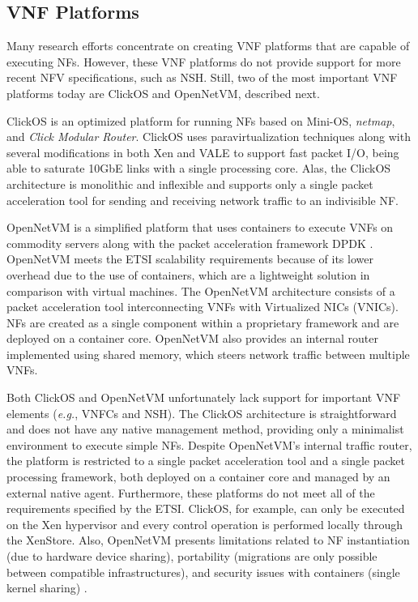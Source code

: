 \subsection{VNF Platforms} \label{PEVNFS}

Many research efforts concentrate on creating VNF platforms that are capable of executing NFs. However, these VNF platforms do not provide support for more recent NFV specifications, such as NSH. Still, two of the most important VNF platforms today are ClickOS and OpenNetVM, described next.

ClickOS \cite{Martins-2014} is an optimized platform for running NFs based on Mini-OS, \textit{netmap}, and \textit{Click Modular Router}. ClickOS uses paravirtualization techniques along with several modifications in both Xen and VALE to support fast packet I/O, being able to saturate 10GbE links with a single processing core. Alas, the ClickOS architecture is monolithic and inflexible and supports only a single packet acceleration tool for sending and receiving network traffic to an indivisible NF.

OpenNetVM \cite{Zhang-2016} is a simplified platform that uses containers to execute VNFs on commodity servers along with the packet acceleration framework DPDK \cite{Intel-2014}. OpenNetVM meets the ETSI scalability requirements because of its lower overhead due to the use of containers, which are a lightweight solution in comparison with virtual machines. The OpenNetVM architecture consists of a packet acceleration tool interconnecting VNFs with Virtualized NICs (VNICs). NFs are created as a single component within a proprietary framework and are deployed on a container core. OpenNetVM also provides an internal router implemented using shared memory, which steers network traffic between multiple VNFs.

Both ClickOS and OpenNetVM unfortunately lack support for important VNF elements (\textit{e.g.}, VNFCs and NSH). The ClickOS architecture is straightforward and does not have any native management method, providing only a minimalist environment to execute simple NFs. Despite OpenNetVM's internal traffic router, the platform is restricted to a single packet acceleration tool and a single packet processing framework, both deployed on a container core and managed by an external native agent. Furthermore, these platforms do not meet all of the requirements specified by the ETSI. ClickOS, for example, can only be executed on the Xen hypervisor and every control operation is performed locally through the XenStore. Also, OpenNetVM presents limitations related to NF instantiation (due to hardware device sharing), portability (migrations are only possible between compatible infrastructures), and security issues with containers (single kernel sharing) \cite{Manco-2017}.
